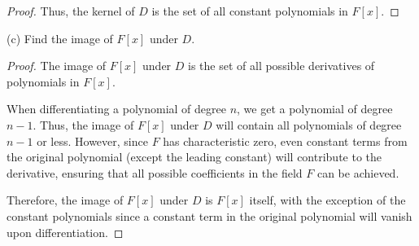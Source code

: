 \documentclass[12pt]{amsart}
\theoremstyle{definition}
\numberwithin{equation}{section}
\theoremstyle{plain}
\begin{document}
\begin{exercise}{27}
\begin{proof}
Thus, the kernel of \( D \) is the set of all constant polynomials in \( F[x] \).
\end{proof}

(c) Find the image of \( F[x] \) under \( D \).

\begin{proof}
The image of \( F[x] \) under \( D \) is the set of all possible derivatives of polynomials in \( F[x] \). 

When differentiating a polynomial of degree \( n \), we get a polynomial of degree \( n-1 \). Thus, the image of \( F[x] \) under \( D \) will contain all polynomials of degree \( n-1 \) or less. However, since \( F \) has characteristic zero, even constant terms from the original polynomial (except the leading constant) will contribute to the derivative, ensuring that all possible coefficients in the field \( F \) can be achieved. 

Therefore, the image of \( F[x] \) under \( D \) is \( F[x] \) itself, with the exception of the constant polynomials since a constant term in the original polynomial will vanish upon differentiation.
\end{proof}

\end{exercise}
\vspace*{60pt}
\end{document}
